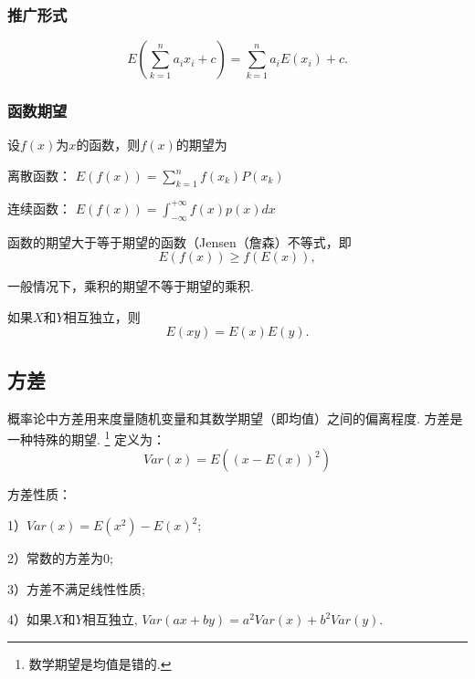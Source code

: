 \subsubsection{ 推广形式}
\label{sec:6.1.2}
\begin{equation}
  \label{eq:0602}
  E(\sum_{k=1}^{n}{a_ix_i+c}) = \sum_{k=1}^{n}{a_iE(x_i)+c}.
\end{equation}
\subsubsection{函数期望}
\label{sec:6.1.3}
设\(f(x)\)为\(x\)的函数，则\(f(x)\)的期望为

离散函数： \(E(f(x))=\sum_{k=1}^{n}{f(x_k)P(x_k)}\)

连续函数： \(E(f(x))=\int_{-\infty}^{+\infty}{f(x)p(x)dx}\)

\begin{remark}
   函数的期望大于等于期望的函数（Jensen（詹森）不等式，即
   \begin{equation*}
     E(f(x))\geqslant f(E(x)),
   \end{equation*}
 \end{remark}
 
 \begin{remark}
一般情况下，乘积的期望不等于期望的乘积.     
\end{remark}


   \begin{remark}
     如果\(X\)和\(Y\)相互独立，则
     \begin{equation}
       \label{eq:0604}
       E(xy)=E(x)E(y)​.
     \end{equation}
   \end{remark}
   \subsection{方差}
   \label{ux65b9ux5dee}
   \begin{defination}
   概率论中方差用来度量随机变量和其数学期望（即均值）之间的偏离程度.
   方差是一种特殊的期望.
   \footnote{数学期望是均值是错的.}
   定义为：
\[
Var(x) = E((x-E(x))^2)
\]     
   \end{defination}

\begin{remark}
  方差性质：
  
1）\(Var(x) = E(x^2) -E(x)^2\);

2）常数的方差为0;

3）方差不满足线性性质;

4）如果\(X\)和\(Y\)相互独立, \(Var(ax+by)=a^2Var(x)+b^2Var(y)\).
\end{remark}

